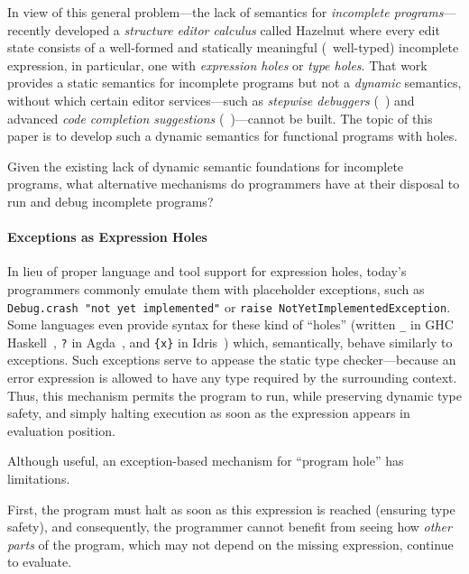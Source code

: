 In view of this general problem---the lack of semantics for \emph{incomplete
programs}---\citet{popl-paper} recently developed a \emph{structure editor
calculus} called Hazelnut where every edit state consists of a well-formed and
statically meaningful (\ie{}~well-typed) incomplete expression, in particular,
one with \emph{expression holes} or \emph{type holes}.
%
That work provides a static semantics for incomplete programs but not a
\emph{dynamic} semantics, without which certain editor services---such as
\emph{stepwise debuggers} (\eg{}~\cite{XXX}) and advanced \emph{code completion
suggestions} (\eg{}~\cite{XXX})---cannot be built.
%
The topic of this paper is to develop such a dynamic semantics for functional
programs with holes.


Given the existing lack of dynamic semantic foundations for incomplete programs,
what alternative mechanisms do programmers have at their disposal to run and
debug incomplete programs?

\paragraph{Exceptions as Expression Holes}
%
In lieu of proper language and tool support for expression holes,
today's programmers commonly emulate them with placeholder exceptions, such as
\verb+Debug.crash "not yet implemented"+ or
\verb+raise NotYetImplementedException+.
%
Some languages even provide syntax for these kind of ``holes''
%
(written \verb+_+ in GHC Haskell~\cite{XXX},
\verb+?+ in Agda~\cite{XXX}, and
\verb+{x}+ in Idris~\cite{XXX})
%
which, semantically, behave similarly to exceptions.
%
%
Such exceptions serve to appease the static type checker---because an
error expression is allowed to have any type required by the surrounding
context.
%
Thus, this mechanism permits the program to run, while preserving dynamic type safety, and
simply halting execution as soon as the expression appears in evaluation
position.

Although useful, an exception-based mechanism for ``program hole'' has limitations.

First,
the program must halt as soon as this expression is reached (ensuring type safety), and consequently, the programmer cannot benefit from seeing how
\emph{other parts} of the program, which may not depend on the missing expression,
continue to evaluate.

